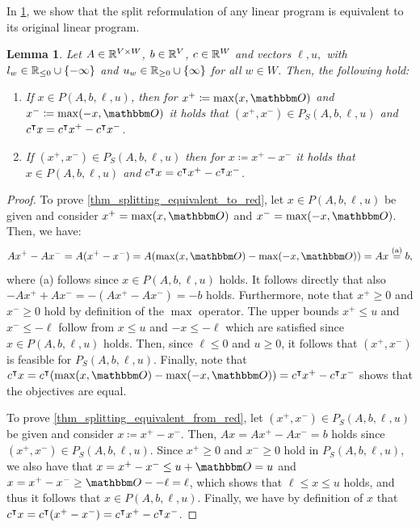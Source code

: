 \documentclass[pdflatex,sn-mathphys-num]{sn-jnl}%
\theoremstyle{thmstyleone}%
\newtheorem{lemma}[lemma]{Lemma}
\theoremstyle{thmstylethree}%
\theoremstyle{thmstyletwo}%
\begin{document}
In \cref{thm_splitting_equivalent}, we show that the split reformulation of any linear program is equivalent to its original linear program.
\begin{lemma}
    \label{thm_splitting_equivalent}
    Let $A\in \mathbb{R}^{V\times W}$, $b\in \mathbb{R}^V$, $c\in \mathbb{R}^W$ and vectors $\ell,u,$ with $l_w \in \mathbb{R}_{\leq0} \cup \{-\infty\}$ and $u_w\in \mathbb{R}_{\geq 0} \cup \{\infty\}$ for all $w\in W$. Then, the following hold:
    \begin{enumerate}[label=(\roman*)]
        \item \label{thm_splitting_equivalent_to_red} If $x\in P(A,b,\ell,u)$, then for $x^+\coloneqq \max(x,\zerovec)$ and $x^-\coloneqq \max(-x,\zerovec)$ it holds that $(x^+,x^-) \in P_S(A,b,\ell,u)$ and $c^{\intercal} x = c^{\intercal}x^+ - c^{\intercal} x^-$.
        \item \label{thm_splitting_equivalent_from_red} If $(x^+,x^-)\in P_S(A,b,\ell,u)$ then for $x\coloneqq x^+ - x^-$ it holds that $x\in P(A,b,\ell,u)$ and $c^{\intercal} x = c^{\intercal}x^+ - c^{\intercal} x^-$.  
    \end{enumerate}
\end{lemma}
\begin{proof}
To prove \ref{thm_splitting_equivalent_to_red}, let $x\in P(A,b,\ell,u)$ be given and consider $x^+=\max(x,\zerovec)$ and $x^-=\max(-x,\zerovec)$. Then, we have:
\begin{equation*}
 Ax^+ - Ax^- = A(x^+-x^-) = A(\max(x,\zerovec)- \max(-x,\zerovec)) = A x \stackrel{\textup{(a)}}{=} b,   
\end{equation*} where \textup{(a)} follows since $x\in P(A,b,\ell,u)$ holds. It follows directly that also $-Ax^+ + Ax^- = -(Ax^+ - Ax^-) = -b$ holds.
Furthermore, note that $x^+ \geq 0$ and $x^-\geq 0$ hold by definition of the $\max$ operator. The upper bounds $x^+\leq u$ and $x^- \leq -\ell$ follow from $x\leq u$ and $-x \leq - \ell$ which are satisfied since $x\in P(A,b,\ell,u)$ holds. Then, since $\ell \leq 0 $ and $u\geq 0$, it follows that $(x^+,x^-)$ is feasible for $ P_S(A,b,\ell,u)$. Finally, note that $\transpose{c} x = \transpose{c} (\max(x,\zerovec)- \max(-x,\zerovec)) = \transpose{c} x^+ - \transpose{c} x^-$ shows that the objectives are equal.

To prove \ref{thm_splitting_equivalent_from_red}, let $(x^+,x^-)\in P_S(A,b,\ell,u)$ be given and consider $x\coloneqq x^+-x^-$. Then, $Ax = A x^+ - Ax^- = b$ holds since $(x^+,x^-) \in P_S(A,b,\ell,u)$. Since $x^+\geq 0$ and $x^-\geq 0$ hold in $P_S(A,b,\ell,u)$, we also have that $x = x^+ - x^- \leq u + \zerovec = u$ and $x = x^+ - x^- \geq \zerovec - -\ell = \ell$, which shows that $\ell \leq x \leq u$ holds, and thus it follows that $x\in P(A,b,\ell,u)$. Finally, we have by definition of $x$ that $c^{\intercal} x = c^{\intercal} (x^+ - x^-) = c^{\intercal} x^+ - c^{\intercal} x^-$. 
\end{proof}
\end{document}
